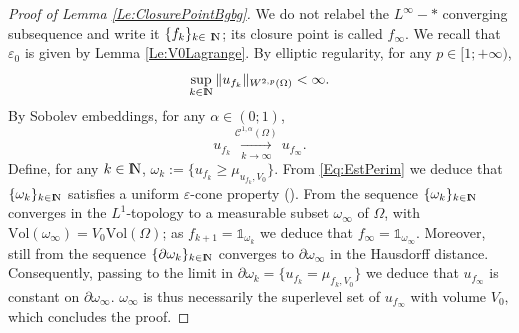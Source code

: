 \documentclass{article}
\newcommand{\N}{\textnormal{I\kern-0.21emN}}
\renewcommand{\geq}{\geqslant}
\def\e{{\varepsilon}}
\def\O{{\Omega}}
\numberwithin{equation}{section}
\begin{document}
\begin{proof}[Proof of Lemma \ref{Le:ClosurePointBgbg}]
We do not relabel the $L^\infty-*$ converging subsequence and write it $\{f_k\}_{k\in \N}$; its closure point is called $f_\infty$. We recall that $\e_0$ is given by Lemma \ref{Le:V0Lagrange}. By elliptic regularity, for any $p\in [1;+\infty)$,
\[ \sup_{k\in \N}\Vert u_{f_k}\Vert_{W^{2,p}(\O)}<\infty.\]
By Sobolev embeddings, for any $\alpha\in (0;1)$,
\[ u_{f_k}\underset{k\to \infty}{\overset{\mathscr C^{1,\alpha}(\O)}\longrightarrow}u_{f_\infty}.\] 
Define, for any $k\in \N$, $\omega_{k}:=\{u_{f_{k}}\geq \mu_{u_{f_k},V_0}\}$. From \eqref{Eq:EstPerim} we deduce that $\{\omega_k\}_{k\in \N}$ satisfies a uniform $\e$-cone property (\cite[Remark 2.4.8]{HenrotPierre}). From \cite[Theorem 2.4.10]{HenrotPierre} the sequence $\{\omega_k\}_{k\in \N}$ converges in the $L^1$-topology to a measurable subset $\omega_\infty$ of $\O$, with $\mathrm{Vol}(\omega_\infty)=V_0\mathrm{Vol}(\O)$; as $f_{k+1}=\mathds 1_{\omega_k}$ we deduce that $f_\infty=\mathds 1_{\omega_\infty}$. Moreover, still from \cite[Theorem 2.4.10]{HenrotPierre} the sequence $\{\partial \omega_k\}_{k\in \N}$ converges to $\partial \omega_\infty$ in the Hausdorff distance. Consequently, passing to the limit in $\partial \omega_k=\{u_{f_k}=\mu_{f_k,V_0}\}$ we deduce that $u_{f_\infty}$ is constant on $\partial \omega_\infty$. $\omega_\infty$ is thus necessarily the superlevel set of $u_{f_\infty}$ with volume $V_0$, which concludes the proof.


\end{proof}
\end{document}
